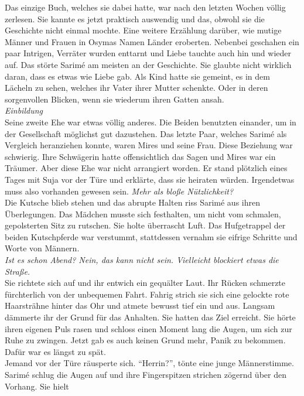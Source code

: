 Das einzige Buch, welches sie dabei hatte, war nach den letzten Wochen völlig zerlesen. Sie kannte 
es jetzt praktisch auswendig und das, obwohl sie die Geschichte nicht einmal mochte. Eine weitere 
Erzählung darüber, wie mutige Männer und Frauen in Osymas Namen Länder eroberten. Nebenbei geschahen 
ein paar Intrigen, Verräter wurden enttarnt und Liebe tauchte auch hin und wieder auf. Das störte 
Sarimé am meisten an der Geschichte. Sie glaubte nicht wirklich daran, dass es etwas wie Liebe gab. 
Als Kind hatte sie gemeint, es in dem Lächeln zu sehen, welches ihr Vater ihrer Mutter schenkte. 
Oder in deren sorgenvollen Blicken, wenn sie wiederum ihren Gatten ansah. \\
\textit{Einbildung}\\
Seine zweite Ehe war etwas völlig anderes. Die Beiden benutzten einander, um in der Gesellschaft 
möglichst gut dazustehen. Das letzte Paar, welches Sarimé als Vergleich heranziehen konnte, waren 
Mires und seine Frau. Diese Beziehung war schwierig. Ihre Schwägerin hatte offensichtlich das Sagen 
und Mires war ein Träumer. Aber diese Ehe war nicht arrangiert worden. Er stand plötzlich eines 
Tages mit Suja vor der Türe und erklärte, dass sie heiraten würden. Irgendetwas muss also vorhanden 
gewesen sein. \textit{Mehr als bloße Nützlichkeit?}\\
Die Kutsche blieb stehen und das abrupte Halten riss Sarimé aus ihren Überlegungen. Das Mädchen 
musste sich festhalten, um nicht vom schmalen, gepolsterten Sitz zu rutschen. Sie holte überrascht 
Luft. Das Hufgetrappel der beiden Kutschpferde war verstummt, stattdessen vernahm sie eifrige 
Schritte und Worte von Männern. \\
\textit{Ist es schon Abend? Nein, das kann nicht sein. Vielleicht blockiert etwas die Straße.}\\
Sie richtete sich auf und ihr entwich ein gequälter Laut. Ihr Rücken schmerzte fürchterlich von der 
unbequemen Fahrt. Fahrig strich sie sich eine gelockte rote Haarsträhne hinter das Ohr und atmete 
bewusst tief ein und aus. Langsam dämmerte ihr der Grund für das Anhalten. Sie hatten das Ziel 
erreicht. Sie hörte ihren eigenen Puls rasen und schloss einen Moment lang die Augen, um sich zur 
Ruhe zu zwingen. Jetzt gab es auch keinen Grund mehr, Panik zu bekommen. Dafür war es längst zu 
spät.\\
Jemand vor der Türe räusperte sich. ``Herrin?'', tönte eine junge Männerstimme.\\
Sarimé schlug die Augen auf und ihre Fingerspitzen strichen zögernd über den Vorhang. Sie hielt 
